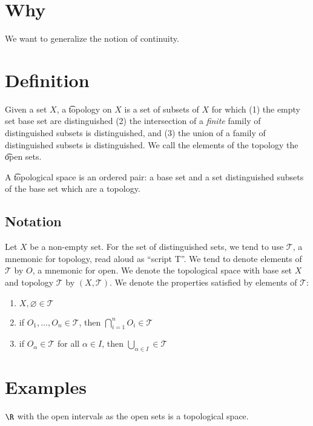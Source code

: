 
\section*{Why}

We want to generalize the notion of continuity.

\section*{Definition}

Given a set $X$, a \t{topology} on $X$ is a set of subsets of $X$ for which (1) the empty set base set are distinguished (2) the intersection of a \textit{finite} family of distinguished subsets is distinguished, and (3) the union of a family of distinguished subsets is distinguished.
We call the elements of the topology the \t{open sets}.

A \t{topological space} is an ordered pair: a base set and a set distinguished subsets of the base set which are a topology.

\subsection*{Notation}

Let $X$ be a non-empty set.
For the set of distinguished sets, we tend to use $\mathcal{T} $, a mnemonic for topology, read aloud as ``script T''.
We tend to denote elements of $\mathcal{T} $ by $O$, a mnemonic for open.
We denote the topological space with base set $X$ and topology $\mathcal{T} $ by $(X, \mathcal{T} )$.
We denote the properties satisfied by elements of $\mathcal{T} $:
    \begin{enumerate}
      \item $X, \varnothing \in \mathcal{T} $
      \item if $O_1, \dots , O_n \in \mathcal{T} $, then $\bigcap_{i = 1}^{n} O_i \in \mathcal{T} $
      \item if $O_\alpha  \in \mathcal{T} $ for all $\alpha  \in I$, then $\bigcup_{\alpha  \in I} \in \mathcal{T} $
    \end{enumerate}

\section*{Examples}

$\R $ with the open intervals as the open sets is a topological space.

\blankpage
